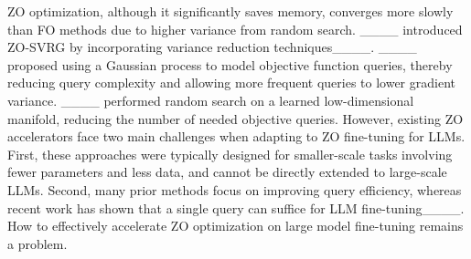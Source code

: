 ZO optimization, although it significantly saves memory, converges more slowly than FO methods due to higher variance from random search. 
____ introduced ZO-SVRG by incorporating variance reduction techniques____. ____ proposed using a Gaussian process to model objective function queries, thereby reducing query complexity and allowing more frequent queries to lower gradient variance. ____ performed random search on a learned low-dimensional manifold, reducing the number of needed objective queries. 
However, existing ZO accelerators face two main challenges when adapting to ZO fine-tuning for LLMs. First, these approaches were typically designed for smaller-scale tasks involving fewer parameters and less data, and cannot be directly extended to large-scale LLMs. Second, many prior methods focus on improving query efficiency, whereas recent work has shown that a single query can suffice for LLM fine-tuning____. How to effectively accelerate ZO optimization on large model fine-tuning remains a problem.



